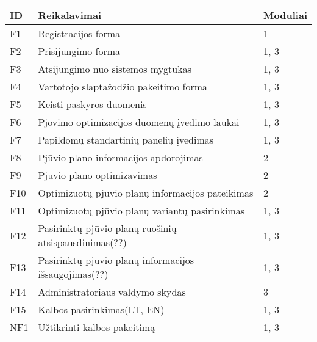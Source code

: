 \documentclass[a4paper,12pt]{article}
\begin{document}
\begin{frame}
\centering

\label{my-label}
\begin{tabular}{|l|l|l|}
\hline
\textbf{ID}	& \textbf{Reikalavimai}						& \textbf{Moduliai}  \\ \hline

F1	& Registracijos forma								& 1	     		\\ \hline

F2	& Prisijungimo forma									& 1, 3			\\ \hline

F3	& Atsijungimo nuo sistemos mygtukas					& 1, 3			\\ \hline

F4	& Vartotojo slaptažodžio pakeitimo forma				& 1, 3			\\ \hline

F5	& Keisti paskyros duomenis	 	  					& 1, 3			\\ \hline 

F6	& Pjovimo optimizacijos duomenų įvedimo laukai		& 1, 3			\\ \hline

F7  & Papildomų standartinių panelių įvedimas 			& 1, 3			\\ \hline

F8	& Pjūvio plano informacijos apdorojimas				& 2				\\ \hline

F9	& Pjūvio plano optimizavimas           	   			& 2				\\ \hline

F10	& Optimizuotų pjūvio planų informacijos pateikimas	& 2     			\\ \hline

F11	& Optimizuotų pjūvio planų variantų pasirinkimas		& 1, 3			\\ \hline

F12	& Pasirinktų pjūvio planų ruošinių atsispausdinimas(??)	& 1, 3			\\ \hline

F13	& Pasirinktų pjūvio planų informacijos išsaugojimas(??)	& 1, 3			\\ \hline

F14	& Administratoriaus valdymo skydas	 	  			& 3				\\ \hline

F15	& Kalbos pasirinkimas(LT, EN)						& 1, 3			\\ \hline

NF1 & Užtikrinti kalbos pakeitimą						& 1, 3			\\ \hline


\end{tabular}
\end{frame}
\end{document}
